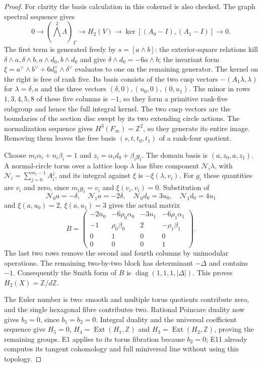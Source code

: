 \begin{proof}
For clarity the basis calculation in this cokernel is also
checked. The graph spectral sequence gives
\[
0\longrightarrow(\textstyle\bigwedge^2\Lambda)_\Gamma
 \longrightarrow H_2(V)
 \longrightarrow\ker[(A_0-I),(A_1-I)]\longrightarrow0.
\]
The first term is generated freely by $s=[a\wedge b]$:
the exterior-square relations kill
$\delta\wedge a,\delta\wedge b,a\wedge d_0,b\wedge d_0$
and give $\delta\wedge d_0=-6a\wedge b$; the invariant
form $\xi=a^\vee\wedge b^\vee+6d_0^\vee\wedge\delta^\vee$
evaluates to one on the remaining generator. The kernel on the
right is free of rank five. Its basis consists of the two cusp
vectors $-(A_1\lambda,\lambda)$ for $\lambda=\delta,a$ and
the three vectors $(\delta,0),(u_0,0),(0,u_1)$.
The minor in rows $1,3,4,5,8$ of these five columns is $-1$,
so they form a primitive rank-five subgroup and hence the full
integral kernel.
The two cusp vectors are the boundaries of the section disc
swept by its two extending circle actions. The normalization
sequence gives $H^3(F_\infty)=\mathbb Z^2$, so they generate
its entire image. Removing them leaves the free basis
$(s,t,t_0,t_1)$ of a rank-four quotient.

Choose $m_i\alpha_i+n_i\beta_i=1$ and
$z_i=\alpha_i d_0+\beta_i g_i$. The domain basis is
$(a,z_0,a,z_1)$. A normal-circle torus over a lattice loop
$\lambda$ has fibre component
$\mathcal N_i\lambda$, with
$\mathcal N_i=\sum_{j=0}^{m_i-1}A_i^j$, and its integral
against $\xi$ is $-\xi(\lambda,v_i)$. For $g_i$ these
quantities are $v_i$ and zero, since $m_i g_i=v_i$ and
$\xi(v_i,v_i)=0$. Substitution of
\[
 \mathcal N_0a=-\delta,\quad\mathcal N_1a=-2\delta,
 \quad\mathcal N_0d_0=3u_0,\quad\mathcal N_1d_0=4u_1
\]
and $\xi(a,u_0)=2$, $\xi(a,u_1)=3$ gives the actual matrix
\[
 B=\begin{pmatrix}
 -2n_0&-6\rho_0\alpha_0&-3n_1&-6\rho_1\alpha_1\\
 -1&\rho_0\beta_0&2&-\rho_1\beta_1\\
 0&1&0&0\\0&0&0&1
 \end{pmatrix}.                              \tag{E.19.2}
\]
The last two rows remove the second and fourth columns by
unimodular operations. The remaining two-by-two block has
determinant $-\Delta$ and contains $-1$. Consequently the Smith
form of $B$ is $\operatorname{diag}(1,1,1,|\Delta|)$.
This proves $H_2(X)=\mathbb Z/d\mathbb Z$.

The Euler number is two: smooth and multiple torus quotients
contribute zero, and the single hexagonal fibre contributes two.
Rational Poincare duality now gives $b_3=0$, since $b_1=b_2=0$.
Integral duality and the universal coefficient sequence give
$H_5=0$, $H_4=\operatorname{Ext}(H_1,\mathbb Z)$ and
$H_3=\operatorname{Ext}(H_2,\mathbb Z)$, proving the remaining
groups. E1 applies to its torus fibration because $b_2=0$;
E11 already computes its tangent cohomology and full miniversal
line without using this topology.
\end{proof}


